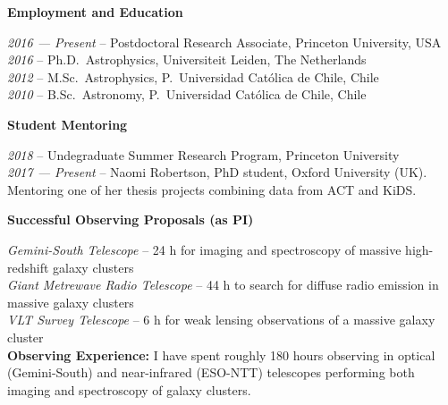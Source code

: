 \documentclass[11pt]{article}
\newcommand\technical[2]{
  \noindent
    {\large\bf #1:} #2\\
  }
\newcommand\sectitle[1]{
  \vspace{0.5cm}
  \noindent
  \textbf{\large #1}\\
  \vspace{-0.2cm}
}
\begin{document}
\vspace{-0.5cm}
\sectitle{Employment and Education}

\noindent
\emph{2016 --- Present} -- Postdoctoral Research Associate, Princeton University, USA\\
\emph{2016} -- Ph.D.~Astrophysics, Universiteit Leiden, The Netherlands\\
\emph{2012} -- M.Sc.~Astrophysics, P.~Universidad Cat\'olica de Chile, Chile\\
\emph{2010} -- B.Sc.~Astronomy, P.~Universidad Cat\'olica de Chile, Chile




\sectitle{Student Mentoring}

\noindent
\emph{2018} -- Undegraduate Summer Research Program, Princeton University\\
\emph{2017 --- Present} -- Naomi Robertson, PhD student, Oxford University (UK). Mentoring one of her thesis projects combining data from ACT and KiDS.


\sectitle{Successful Observing Proposals (as PI)}

\noindent
\emph{Gemini-South Telescope} -- 24 h for imaging and spectroscopy of massive 
high-redshift galaxy clusters\\
\emph{Giant Metrewave Radio Telescope} -- 44 h to search for diffuse radio 
emission in massive galaxy clusters\\
\emph{VLT Survey Telescope} -- 6 h for weak lensing observations of a massive 
galaxy cluster\\


\technical{Observing Experience}
{I have spent roughly 180 hours observing in 
optical (Gemini-South) and near-infrared (ESO-NTT) telescopes performing both 
imaging and spectroscopy of galaxy clusters.}\\
\end{document}
